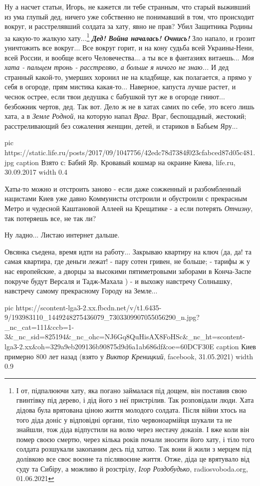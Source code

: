 Ну а насчет статьи, Игорь, не кажется ли тебе странным, что старый выживший из
ума глупый дед, ничего уже собственно не понимавший в том, что происходит
вокруг, и расстрелявший солдата за хату, явно не прав? Убил Защитника Родины за
какую-то жалкую хату...\footnote{
І от, підпалюючи хату, яка погано займалася під дощем, він поставив свою
гвинтівку під дерево, і дід його з неї пристрілив. Так розповідали люди. Хата
дідова була врятована ціною життя молодого солдата. Після війни хтось на того
діда доніс у відповідні органи, тіло червоноармійця шукали та не знайшли, тож
діда відпустили на волю через нестачу доказів. І вже коли він помер своєю
смертю, через кілька років почали зносити його хату, і тіло того солдата
розшукали закопаним десь під хатою. Так вони й жили з мерцем під долівкою все
своє воєнне та післявоєнне життя. Отже, діда це врятувало від суду та Сибіру, а
можливо й розстрілу, \emph{Ігор Роздобудько}, radiosvoboda.org, 01.06.2021} \textbf{\emph{Дед! Война
началась! Очнись!}} Зло напало, и грозит уничтожить все вокруг... Все вокруг
горит, и на кону судьба всей Украины-Нени, всей России, и вообще всего
Человечества...  а ты все в фантазиях витаешь... \emph{Моя хата - пальцем тронь
- расстреляю, а больше я ничого не знаю...} И дед странный какой-то, умерших
хоронил не на кладбище, как полагается, а прямо у себя в огороде, прям мистика
какая-то... Наверное, капуста лучше растет, и чеснок острее, если твои дедушка
с бабушкой тут же в огороде гниют...  безбожник чертов, дед. Так вот. Дело ж не
в хатах самих по себе, это всего лишь хата, а в \emph{Земле Родной}, на которую
напал \emph{Враг}. Враг, беспощадный, жестокий; расстреливающий без сожаления
женщин, детей, и стариков в Бабьем Яру...

\ifcmt
  pic https://static.life.ru/posts/2017/09/1047756/42edc78d7384f023cfabced87d05c481.jpg
  caption Взято с: Бабий Яр. Кровавый кошмар на окраине Киева, life.ru, 30.09.2017
  width 0.4
\fi

Хаты-то можно и отстроить заново - если даже сожженный и разбомбленный
нацистами Киев уже давно Коммунисты отстроили и обустроили с прекрасным Метро и
чудесной Каштановой Аллеей на Крещатике - а если потерять \emph{Отчизну}, так
потеряешь все, не так ли?

Ну ладно... Листаю интернет дальше. 

Овсянка съедена, время идти на работу... Закрываю квартиру на ключ (да, да! та самая квартира, где деньги
лежат! - пару сотен гривен, не больше; - тарифы ж у нас европейские, а дворцы
за высокими пятиметровыми заборами в Конча-Заспе покруче будут Версаля и
Тадж-Махала ) - и выхожу навстречу Солнышку, навстречу самому прекрасному
Городу на Земле... 

\ifcmt
  pic https://scontent-lga3-2.xx.fbcdn.net/v/t1.6435-9/193983110_1449248275436079_7303309907055056290_n.jpg?_nc_cat=111&ccb=1-3&_nc_sid=825194&_nc_ohc=NJ6Gq8QuHisAX8FoHSc&_nc_ht=scontent-lga3-2.xx&oh=329a9eb209136b90875d9d6a1ab686df&oe=60DCF30E
  caption Киев примерно 800 лет назад (взято у \emph{Виктор Креницкий}, facebook, 31.05.2021)
  width 0.9
\fi
